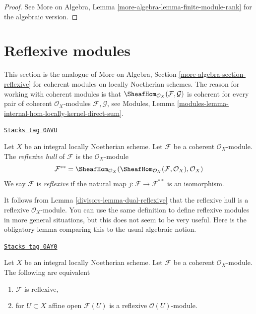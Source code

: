\begin{proof}
See More on Algebra, Lemma \ref{more-algebra-lemma-finite-module-rank}
for the algebraic version.
\end{proof}

\section{Reflexive modules}
\label{divisors-section-reflexive}
This section is the analogue of
More on Algebra, Section \ref{more-algebra-section-reflexive}
for coherent modules on locally Noetherian schemes. The reason for
working with coherent modules is that
$\SheafHom_{\mathcal{O}_X}(\mathcal{F}, \mathcal{G})$ is coherent
for every pair of coherent $\mathcal{O}_X$-modules $\mathcal{F}, \mathcal{G}$,
see Modules, Lemma \ref{modules-lemma-internal-hom-locally-kernel-direct-sum}.

\begin{definition}[Reflexive]
\label{divisors-definition-reflexive}
\href{https://stacks.math.columbia.edu/tag/0AVU}{\texttt{Stacks tag 0AVU}}

Let $X$ be an integral locally Noetherian scheme. Let $\mathcal{F}$
be a coherent $\mathcal{O}_X$-module. The {\it reflexive hull}
of $\mathcal{F}$ is the $\mathcal{O}_X$-module
$$
\mathcal{F}^{**} = \SheafHom_{\mathcal{O}_X}(
\SheafHom_{\mathcal{O}_X}(\mathcal{F}, \mathcal{O}_X), \mathcal{O}_X)
$$
We say $\mathcal{F}$ is {\it reflexive} if the natural map
$j : \mathcal{F} \longrightarrow \mathcal{F}^{**}$
is an isomorphism.
\end{definition}

It follows from Lemma \ref{divisors-lemma-dual-reflexive} that the reflexive hull
is a reflexive $\mathcal{O}_X$-module.
You can use the same definition to define reflexive modules in more
general situations, but this does not seem to be very useful.
Here is the obligatory lemma comparing this to the usual algebraic notion.

\begin{lemma}
\label{divisors-lemma-check-reflexive-on-affines}
\href{https://stacks.math.columbia.edu/tag/0AY0}{\texttt{Stacks tag 0AY0}}

Let $X$ be an integral locally Noetherian scheme. Let $\mathcal{F}$ be a
coherent $\mathcal{O}_X$-module. The following are equivalent
\begin{enumerate}
\item $\mathcal{F}$ is reflexive,
\item for $U \subset X$ affine open $\mathcal{F}(U)$
is a reflexive $\mathcal{O}(U)$-module.
\end{enumerate}
\end{lemma}

